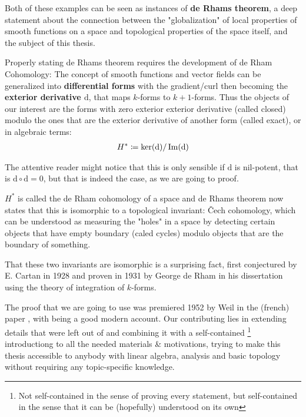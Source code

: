 Both of these examples can be seen as instances of \textbf{de Rhams theorem}, a deep statement about the connection between the "globalization"
of local properties of smooth functions on a space and topological properties of the space itself,
and the subject of this thesis.

Properly stating de Rhams theorem requires the development of de Rham Cohomology: The concept of smooth
functions and vector fields can be generalized into \textbf{differential forms} with the gradient/curl then
becoming the \textbf{exterior derivative $\mathrm{d}$}, that maps $k$-forms to $k+1$-forms. Thus the objects
of our interest are the forms with zero exterior exterior derivative (called closed) modulo the ones that are
the exterior derivative of another form (called exact), or in algebraic terms:
\begin{align*}
	H^* \coloneqq \ker(\mathrm{d}) / \operatorname{Im}(\mathrm{d})
\end{align*}

\begin{remark}
The attentive reader might notice that this is only sensible if $\mathrm{d}$ is nil-potent, that
is $\mathrm{d} \circ \mathrm{d} = 0$, but that is indeed the case, as we are going to proof.
\end{remark}

$H^*$ is called the de Rham cohomology of a space and de Rhams theorem now states that this is
isomorphic to a topological invariant: Čech cohomology, which can be understood as measuring the "holes"
in a space by detecting certain objects that have empty boundary (caled cycles) modulo objects that are the
boundary of something.

That these two invariants are isomorphic is a surprising fact, first conjectured by E. Cartan in 1928 and
proven in 1931 by George de Rham in his dissertation \cite{de_rham_sur_1931} using the theory of integration
of $k$-forms.

The proof that we are going to use was premiered 1952 by Weil in the (french) paper \cite{weil_sur_1952},
with \cite{tu_differential_1982} being a good modern account. Our contributing lies in extending details
that were left out of \cite{tu_differential_1982} and combining it with a self-contained \footnote{
Not self-contained in the sense of proving every statement, but self-contained in the sense that it can be
(hopefully) understood on its own
} introductiong to all the needed materials \& motivations, trying to make this thesis accessible to anybody
with linear algebra, analysis and basic topology without requiring any topic-specific knowledge.
 
